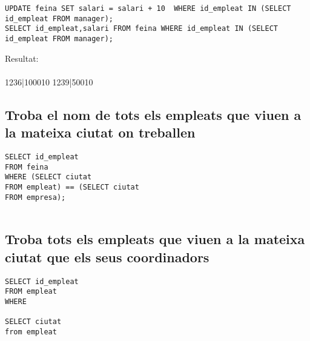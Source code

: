 \documentclass[11p]{article}
\begin{document}
\begin{lstlisting}
UPDATE feina SET salari = salari + 10  WHERE id_empleat IN (SELECT id_empleat FROM manager);
SELECT id_empleat,salari FROM feina WHERE id_empleat IN (SELECT id_empleat FROM manager);
\end{lstlisting}

Resultat:\\\\

1236|100010
1239|50010

\subsection{Troba el nom de tots els empleats que viuen a la mateixa ciutat on treballen}

\begin{lstlisting}
SELECT id_empleat
FROM feina
WHERE (SELECT ciutat
FROM empleat) == (SELECT ciutat
FROM empresa);


\end{lstlisting}

\subsection{Troba tots els empleats que viuen a la mateixa ciutat que els seus coordinadors}

\begin{lstlisting}
SELECT id_empleat
FROM empleat
WHERE

SELECT ciutat
from empleat


\end{lstlisting}
\end{document}
